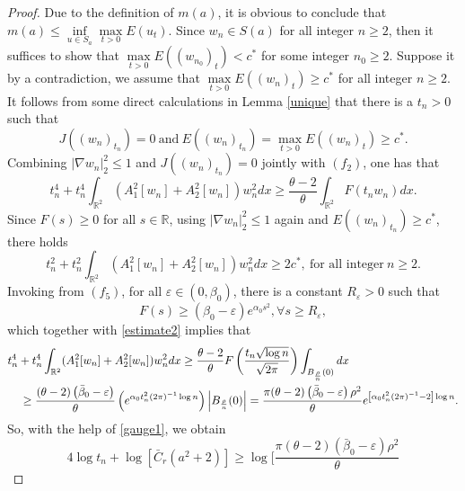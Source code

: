 \documentclass[11pt]{amsart}
\numberwithin{equation}{section}
\theoremstyle{definition}
\newcommand{\R}{\mathbb{R}}
\begin{document}
\begin{proof}
Due to the definition of $m(a)$, it is obvious to conclude that $m(a)\leq \inf\limits_{u\in S_a}\max\limits_{t>0}E(u_t)$.
Since $w_n\in S(a)$ for all integer $n\geq2$, then it suffices to show that
$\max\limits_{t>0}E((w_{n_0})_t)<c^*$ for some integer $n_0\geq2$.
Suppose it by a contradiction, we assume that $\max\limits_{t>0}E((w_{n})_t)\geq c^*$ for all integer $n\geq2$.
It follows from some direct calculations in Lemma \ref{unique} that there is a $t_n>0$ such that
\[
J((w_{n})_{t_n})=0~\text{and}~E((w_{n})_{t_n})=\max\limits_{t>0}E((w_{n})_t)\geq c^*.
\]
Combining $|\nabla w_n|_2^2\leq1$ and $J((w_{n})_{t_n})=0$ jointly with
$(f_2)$, one has that
\begin{equation}\label{estimate2}
t_{n}^{4} +t_{n}^{4}\int_{\R^2} (A_1^2[w_n]+A_2^2[w_n])w_n^2 dx\geq  \frac{\theta-2}{\theta} \int_{\mathbb{R}^{2}}
F\left(t_{n} w_{n}\right)  dx.
\end{equation}
Since $F(s)\geq0$ for all $s\in\R$, using $|\nabla w_n|_2^2\leq1$ again and $E((w_{n})_{t_n})\geq c^*$, there holds
\begin{equation}\label{estimate3}
t_n^{2}+t_n^{2} \int_{\R^2} (A_1^2[w_n]+A_2^2[w_n])w_n^2 dx\geq 2c^*,~\text{for all integer}~n\geq2.
\end{equation}
Invoking from $\left(f_{5}\right)$, for all $\varepsilon \in\left(0, \beta_{0}\right)$, there is
a constant $R_{\varepsilon}>0$ such that
$$
F(s)   \geq  \left(\beta_{0}-\varepsilon\right)  e^{\alpha_{0} s^{2}}, \forall s \geq R_{\varepsilon},
$$
which together with \eqref{estimate2} implies that
\begin{equation}\label{estimate4}
\begin{gathered}
t_{n}^{4} +t_{n}^{4}\int_{\R^2} (A_1^2[w_n]+A_2^2[w_n])w_n^2 dx
\geq  \frac{\theta-2}{\theta} F\left(\frac{t_{n} \sqrt{\log n}}{\sqrt{2 \pi}  }\right)  \int_{B_{\frac\rho n}(0)}
d x \hfill\\
\ \ \ \   \geq \frac{\left(\theta-2\right) \left(\bar{\beta}_{0}-\varepsilon\right)}{\theta}
\left(e^{\alpha_{0} t_{n}^{2} (2\pi)^{-1} \log n}\right)
 \left|B_{\frac\rho n}(0)\right|
 =\frac{\pi(\theta-2)\left(\bar{\beta}_{0}-\varepsilon\right)\rho^2}{\theta}
e^{\left[\alpha_{0} t_{n}^{2} (2\pi)^{-1} -2\right]
\log n} .\hfill\\
\end{gathered}
\end{equation}
So, with the help of \eqref{gauge1}, we obtain
\begin{equation}\label{estimate5}
4\log t_n  +\log[\bar{C}_r(a^2+2)] \geq \log\bigg[\frac{\pi(\theta-2)\left(\bar{\beta}_{0}-\varepsilon\right)\rho^2}{\theta}

\end{equation}
\end{proof}
\end{document}
